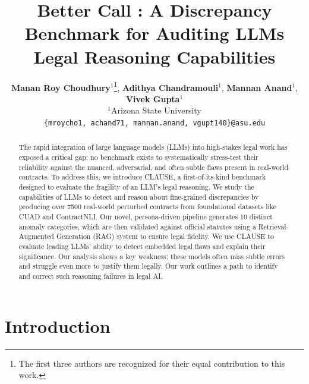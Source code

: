 \documentclass[11pt]{article}
\title{Better Call \datasetName: A Discrepancy Benchmark for Auditing LLMs Legal Reasoning Capabilities}
\author{
\textbf{Manan Roy Choudhury}$^{1}$\thanks{\fontsize{10.5}{12.5}\selectfont The first three authors are recognized for their equal contribution to this work.},
\textbf{Adithya Chandramouli}$^{1}$\footnotemark[1],
\textbf{Mannan Anand}$^{1}$\footnotemark[1],
\textbf{Vivek Gupta}$^{1}$\\[4pt]
$^{1}$Arizona State University\\[2pt]
\texttt{\{mroycho1, achand71, mannan.anand, vgupt140\}@asu.edu}
}
\begin{document}
\maketitle
\begin{abstract}
The rapid integration of large language models (LLMs) into high-stakes legal work has exposed a critical gap: no benchmark exists to systematically stress-test their reliability against the nuanced, adversarial, and often subtle flaws present in real-world contracts. To address this, we introduce CLAUSE, a first-of-its-kind benchmark designed to evaluate the fragility of an LLM's legal reasoning. We study the capabilities of LLMs to detect and reason about fine-grained discrepancies by producing over 7500 real-world perturbed contracts from foundational datasets like CUAD and ContractNLI. Our novel, persona-driven pipeline generates 10 distinct anomaly categories, which are then validated against official statutes using a Retrieval-Augmented Generation (RAG) system to ensure legal fidelity. We use CLAUSE to evaluate leading LLMs’ ability to detect embedded legal flaws and explain their significance. Our analysis shows a key weakness: these models often miss subtle errors and struggle even more to justify them legally. Our work outlines a path to identify and correct such reasoning failures in legal AI.

\end{abstract}

\section{Introduction}
\end{document}

